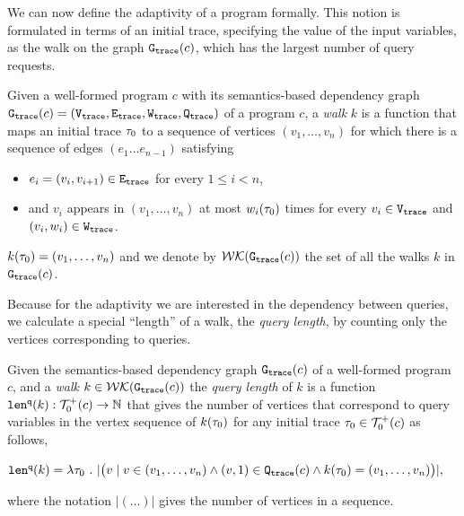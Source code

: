 We can now define the adaptivity of a program formally. This notion is formulated in terms of an initial trace, specifying the value of the input variables, as the walk on the graph $\mathtt{{G_{trace}}}({c})$, which has the largest number of query requests.


\begin{defn}[Walk]
\label{def:finitewalk}
Given a well-formed program $c$ with its semantics-based dependency graph $\mathtt{{G_{trace}}}({c}) = (\mathtt{{V_{trace}}}, \mathtt{{E_{trace}}}, \mathtt{{W_{trace}}}, \mathtt{{Q_{trace}}})$ of a program $c$, a \emph{walk} $k$ is a function that maps an initial trace $\mathtt{\tau}_0$ to a sequence of vertices $(v_1, \ldots, v_{n})$
for which there is a sequence of edges $(e_1 \ldots e_{n - 1})$  satisfying
\begin{itemize}
\item $e_i = (v_{i},v_{i + 1}) \in \mathtt{{E_{trace}}}$ for every $1 \leq i < n$,
\item and $v_i$ appears in $(v_1, \ldots, v_{n})$ at most $w_i(\mathtt{\tau}_0)$ times for every $v_i \in \mathtt{{V_{trace}}}$ and $(v_i, w_i) \in \mathtt{{W_{trace}}}$.  
\end{itemize}
$k(\mathtt{\tau}_0) = (v_1, \ldots, v_{n})$
and we denote by $\mathcal{WK}(\mathtt{{G_{trace}}}(c))$
the set of all the walks $k$ in $\mathtt{{G_{trace}}}(c)$.
\end{defn} 
Because for the adaptivity
we are interested in the dependency between queries,
we calculate a special ``length'' of a walk, the \emph{query length},  by counting only the vertices
corresponding to queries.
\begin{defn}
\label{def:qlen}
Given 
the semantics-based dependency graph $\mathtt{{G_{trace}}}({c})$ of a well-formed program $c$,
 and a \emph{walk} 
 $k \in \mathcal{WK}(\mathtt{{G_{trace}}}(c))$ 
the \emph{query length} of $k$ is a function $\mathtt{len}^{\tt q}(k):\mathcal{T}^{+}_0(c) \to \mathbb{N}$ that 
gives
the number of vertices that correspond to query variables in the vertex sequence of $k(\mathtt{\tau}_0)$
for any initial trace $\mathtt{\tau}_0 \in \mathcal{T}^{+}_0(c)$ as follows, 
\begin{center}
   $
  \mathtt{len}^{\tt q}(k) = \lambda \mathtt{\tau}_0 ~.~ |\big( v \mid v \in (v_1, \ldots, v_{n}) \land (v, 1) \in \mathtt{{Q_{trace}}}(c) 
  \land k(\mathtt{\tau}_0) = (v_1, \ldots, v_{n}) \big)|,
$
\end{center}
where the notation $| (\ldots) |$ gives the number of vertices in a sequence.
\end{defn}
